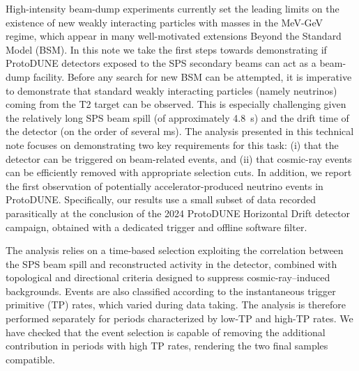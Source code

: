 
High-intensity beam-dump experiments currently set the leading limits on the existence of new weakly interacting particles with masses in the MeV-GeV regime, which appear in many well-motivated extensions Beyond the Standard Model (BSM).
%
In this note we take the first steps towards demonstrating if ProtoDUNE detectors exposed to the SPS secondary beams can act as a beam-dump facility. Before any search for new BSM can be attempted, it is imperative to demonstrate that standard weakly interacting particles (namely neutrinos) coming from the T2 target can be observed. This is especially challenging given the relatively long SPS beam spill (of approximately 4.8~s) and the drift time of the detector (on the order of several ms).
The analysis presented in this technical note focuses on demonstrating two key requirements for this task: (i) that the detector can be triggered on beam-related events, and (ii) that cosmic-ray events can be efficiently removed with appropriate selection cuts. In addition, we report the first observation of potentially accelerator-produced neutrino events in ProtoDUNE. Specifically, our results use a small subset of data recorded parasitically at the conclusion of the 2024 ProtoDUNE Horizontal Drift detector campaign, obtained with a dedicated trigger and offline software filter. 

The analysis relies on a time-based selection exploiting the correlation between the SPS beam spill and reconstructed activity in the detector, combined with topological and directional criteria designed to suppress cosmic-ray–induced backgrounds. Events are also classified according to the instantaneous trigger primitive (TP) rates, which varied during data taking. The analysis is therefore performed separately for periods characterized by low-TP and high-TP rates. We have checked that the event selection is capable of removing the additional contribution in periods with high TP rates, rendering the two final samples compatible. 


